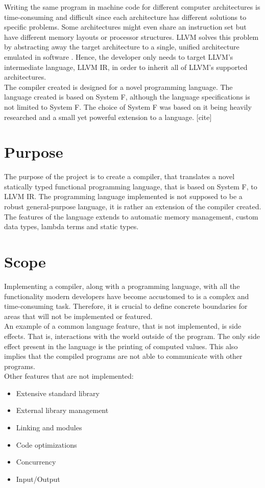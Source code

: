 Writing the same program in machine code for different computer architectures is time-consuming and difficult since
each architecture has different solutions to specific problems. Some architectures might even share an instruction
set but have different memory layouts or processor structures. LLVM \cite{llvm} solves this problem by abstracting
away the target architecture to a single, unified architecture emulated in software \cite{lattner}. Hence, the developer
only needs to target LLVM's intermediate language, LLVM IR, in order to inherit all of LLVM's supported architectures.\\


The compiler created is designed for a novel programming language. The language created is based on System F, although the language specifications is not limited to System F. The choice of System F was based on it being heavily researched and a small yet powerful extension to a language. [cite]

\section{Purpose}


The purpose of the project is to create a compiler, that translates a novel statically typed functional programming language, that is based on System F, to LLVM IR. 
The programming language implemented is not supposed to be a robust general-purpose language, it is rather an extension of the compiler created. 
The features of the language extends to automatic memory management, custom data types, lambda terms and static types. 

\section{Scope}

Implementing a compiler, along with a programming language, with all the functionality modern developers have become accustomed to is a complex and time-consuming task. 
Therefore, it is crucial to define concrete boundaries for areas that will not be implemented or featured. \\

An example of a common language feature, that is not implemented, is side effects. 
That is, interactions with the world outside of the program. 
The only side effect present in the language is the printing of computed values. 
This also implies that the compiled programs are not able to communicate with other programs.\\

Other features that are not implemented:
\begin{itemize}
    \item Extensive standard library
    \item External library management
    \item Linking and modules
    \item Code optimizations
    \item Concurrency
    \item Input/Output
\end{itemize}